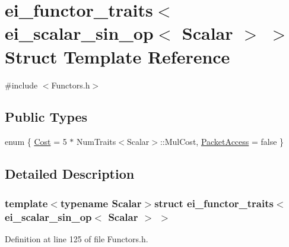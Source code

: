 \hypertarget{structei__functor__traits_3_01ei__scalar__sin__op_3_01_scalar_01_4_01_4}{\section{ei\-\_\-functor\-\_\-traits$<$ ei\-\_\-scalar\-\_\-sin\-\_\-op$<$ Scalar $>$ $>$ Struct Template Reference}
\label{structei__functor__traits_3_01ei__scalar__sin__op_3_01_scalar_01_4_01_4}
}


{\ttfamily \#include $<$Functors.\-h$>$}

\subsection*{Public Types}
\begin{DoxyCompactItemize}
\item 
enum \{ \hyperlink{structei__functor__traits_3_01ei__scalar__sin__op_3_01_scalar_01_4_01_4_a58fabbf1234b822c0f193f0cd98463eda628ac860cc5d8142d503dde3167ab629}{Cost} = 5 $\ast$ Num\-Traits$<$Scalar$>$\-:\-:Mul\-Cost, 
\hyperlink{structei__functor__traits_3_01ei__scalar__sin__op_3_01_scalar_01_4_01_4_a58fabbf1234b822c0f193f0cd98463edadc17df14059df5fd6d53326303cb7905}{Packet\-Access} = false
 \}
\end{DoxyCompactItemize}


\subsection{Detailed Description}
\subsubsection*{template$<$typename Scalar$>$struct ei\-\_\-functor\-\_\-traits$<$ ei\-\_\-scalar\-\_\-sin\-\_\-op$<$ Scalar $>$ $>$}



Definition at line 125 of file Functors.\-h.



